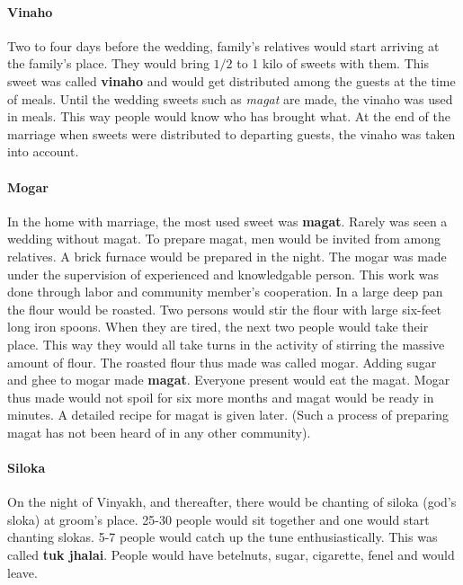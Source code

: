 \paragraph{Vinaho} Two to four days before the wedding, family's relatives
would start arriving at the family's place. They would bring $1/2$ to 1 kilo of
sweets with them. This sweet was called \textbf{vinaho} and would get
distributed among the guests at the time of meals. Until the wedding sweets
such as \textit{magat} are made, the vinaho was used in meals. This way people
would know who has brought what. At the end of the marriage when sweets were
distributed to departing guests, the vinaho was taken into account.

\paragraph{Mogar} In the home with marriage, the most used sweet was
\textbf{magat}. Rarely was seen a wedding without magat. To prepare magat, men
would be invited from among relatives. A brick furnace would be prepared in the
night. The mogar was made under the supervision of experienced and knowledgable
person. This work was done through labor and community member's cooperation. In
a large deep pan the flour would be roasted. Two persons would stir the flour
with large six-feet long iron spoons. When they are tired, the next two people
would take their place. This way they would all take turns in the activity of
stirring the massive amount of flour. The roasted flour thus made was called
mogar. Adding sugar and ghee to mogar made \textbf{magat}. Everyone present
would eat the magat. Mogar thus made would not spoil for six more months and
magat would be ready in minutes. A detailed recipe for magat is given later.
(Such a process of preparing magat has not been heard of in any other
community).

\paragraph{Siloka} On the night of Vinyakh, and thereafter, there would be
chanting of siloka (god's sloka) at groom's place. 25-30 people would sit
together and one would start chanting slokas. 5-7 people would catch up the
tune enthusiastically. This was called \textbf{tuk jhalai}. People would have
betelnuts, sugar, cigarette, fenel and would leave.

